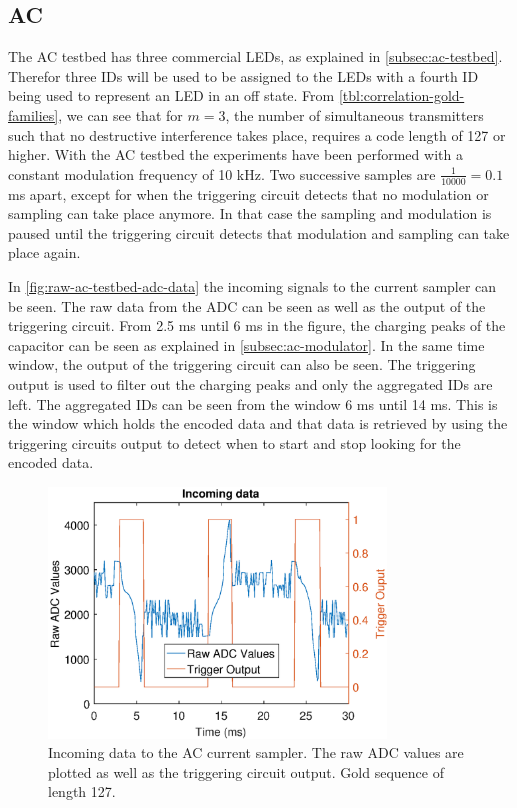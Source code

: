 
\subsection{AC}
\label{subsec:ac-evaluation}


The AC testbed has three commercial LEDs, as explained in \autoref{subsec:ac-testbed}.
Therefor three IDs will be used to be assigned to the LEDs with a fourth ID being used to represent an LED in an off state.
From \autoref{tbl:correlation-gold-families}, we can see that for $m = 3$, the number of simultaneous transmitters such that no destructive interference takes place, requires a code length of 127 or higher.
With the AC testbed the experiments have been performed with a constant modulation frequency of 10 kHz.
Two successive samples are $\frac{1}{10000} = 0.1$ ms apart, except for when the triggering circuit detects that no modulation or sampling can take place anymore.
In that case the sampling and modulation is paused until the triggering circuit detects that modulation and sampling can take place again.


In \autoref{fig:raw-ac-testbed-adc-data} the incoming signals to the current sampler can be seen.
The raw data from the ADC can be seen as well as the output of the triggering circuit.
From 2.5 ms until 6 ms in the figure, the charging peaks of the capacitor can be seen as explained in \autoref{subsec:ac-modulator}.
In the same time window, the output of the triggering circuit can also be seen.
The triggering output is used to filter out the charging peaks and only the aggregated IDs are left.
The aggregated IDs can be seen from the window 6 ms until 14 ms.
This is the window which holds the encoded data and that data is retrieved by using the triggering circuits output to detect when to start and stop looking for the encoded data.

\begin{figure}[ht]
  \centering
  \includegraphics[width=0.8\textwidth]{chapters/evaluation-chapters/hardware/ac/raw-ac-testbed-adc-data.eps}
  \caption{Incoming data to the AC current sampler. The raw ADC values are plotted as well as the triggering circuit output. Gold sequence of length 127.}
  \label{fig:raw-ac-testbed-adc-data}
\end{figure}


